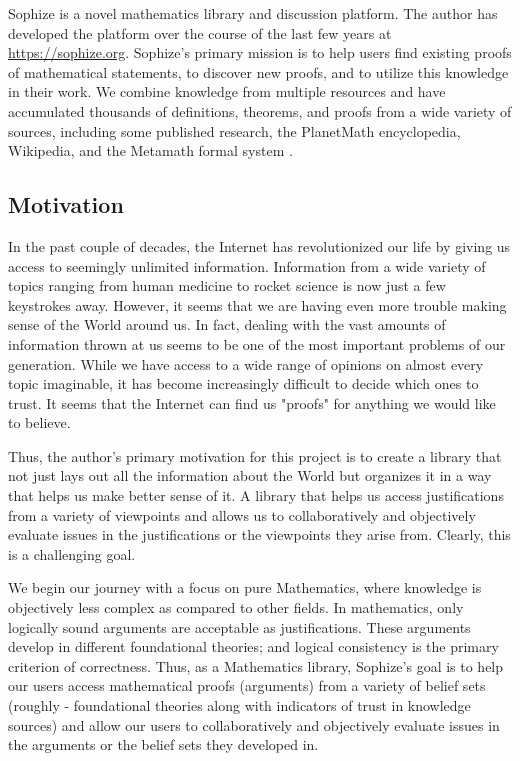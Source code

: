 \documentclass[runningheads]{llncs}
\begin{document}
Sophize is a novel mathematics library and discussion platform. The author has developed the
platform over the course of the last few years at \url{https://sophize.org}. Sophize's
primary mission is to help users find existing proofs of mathematical statements, to
discover new proofs, and to utilize this knowledge in their work. We combine knowledge from
multiple resources and have accumulated thousands of definitions, theorems, and proofs from
a wide variety of sources, including some published research, the PlanetMath encyclopedia,
Wikipedia, and the Metamath formal system \cite{metamath}.

\subsection{Motivation}

In the past couple of decades, the Internet has revolutionized our life by giving us access
to seemingly unlimited information. Information from a wide variety of topics ranging from
human medicine to rocket science is now just a few keystrokes away. However, it seems
that we are having even more trouble making sense of the World around us. In fact, dealing with the vast amounts of information thrown at us seems to be one of the most important problems of our generation. While we have access to a wide range of opinions on almost every topic imaginable, it has become increasingly difficult to decide which ones to trust. It seems that the Internet can find us "proofs" for anything we would like to believe.

Thus, the author's primary motivation for this project is to create a library that not just lays out all the information about the World but organizes it in a way that helps us make better sense of it. A library that helps us access justifications from a variety of
viewpoints and allows us to collaboratively and objectively evaluate issues in the
justifications or the viewpoints they arise from. Clearly, this is a challenging goal. 

We begin our journey with a focus on pure Mathematics, where knowledge is objectively less
complex as compared to other fields. In mathematics, only logically sound arguments are
acceptable as justifications. These arguments develop in different foundational theories;
and logical consistency is the primary criterion of correctness. Thus, as a
Mathematics library, Sophize's goal is to help our users access mathematical proofs (arguments) from a variety of belief sets (roughly - foundational theories along with indicators of trust in knowledge sources) and allow our users to collaboratively and objectively evaluate issues in the arguments or the belief sets they developed in.
\end{document}
